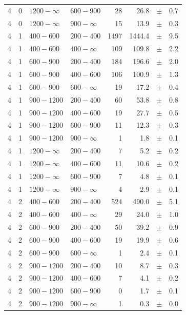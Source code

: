 \begin{table}[!h]
\begin{tabular}{rrllrrcl}
4 & 0 & $1200- \infty$ & $600-900$ &     28 &     26.8 &$\pm$&    0.7 \\
4 & 0 & $1200- \infty$ & $900-\infty$ &     15 &     13.9 &$\pm$&    0.3 \\
4\T & 1 & $ 400- 600$ & $200-400$ &   1497 &   1444.4 &$\pm$&    9.5 \\
4 & 1 & $ 400- 600$ & $400-\infty$ &    109 &    109.8 &$\pm$&    2.2 \\
4\T & 1 & $ 600- 900$ & $200-400$ &    184 &    196.6 &$\pm$&    2.0 \\
4 & 1 & $ 600- 900$ & $400-600$ &    106 &    100.9 &$\pm$&    1.3 \\
4 & 1 & $ 600- 900$ & $600-\infty$ &     19 &     17.2 &$\pm$&    0.4 \\
4\T & 1 & $ 900-1200$ & $200-400$ &     60 &     53.8 &$\pm$&    0.8 \\
4 & 1 & $ 900-1200$ & $400-600$ &     19 &     27.7 &$\pm$&    0.5 \\
4 & 1 & $ 900-1200$ & $600-900$ &     11 &     12.3 &$\pm$&    0.3 \\
4 & 1 & $ 900-1200$ & $900-\infty$ &      1 &      1.8 &$\pm$&    0.1 \\
4\T & 1 & $1200- \infty$ & $200-400$ &      7 &      5.2 &$\pm$&    0.2 \\
4 & 1 & $1200- \infty$ & $400-600$ &     11 &     10.6 &$\pm$&    0.2 \\
4 & 1 & $1200- \infty$ & $600-900$ &      7 &      4.8 &$\pm$&    0.1 \\
4 & 1 & $1200- \infty$ & $900-\infty$ &      4 &      2.9 &$\pm$&    0.1 \\
4\T & 2 & $ 400- 600$ & $200-400$ &    524 &    490.0 &$\pm$&    5.1 \\
4 & 2 & $ 400- 600$ & $400-\infty$ &     29 &     24.0 &$\pm$&    1.0 \\
4\T & 2 & $ 600- 900$ & $200-400$ &     50 &     39.2 &$\pm$&    0.9 \\
4 & 2 & $ 600- 900$ & $400-600$ &     19 &     19.9 &$\pm$&    0.6 \\
4 & 2 & $ 600- 900$ & $600-\infty$ &      1 &      2.4 &$\pm$&    0.1 \\
4\T & 2 & $ 900-1200$ & $200-400$ &     10 &      8.7 &$\pm$&    0.3 \\
4 & 2 & $ 900-1200$ & $400-600$ &      7 &      4.1 &$\pm$&    0.2 \\
4 & 2 & $ 900-1200$ & $600-900$ &      0 &      1.7 &$\pm$&    0.1 \\
4 & 2 & $ 900-1200$ & $900-\infty$ &      1 &      0.3 &$\pm$&    0.0 \\

\end{tabular}
\end{table}
